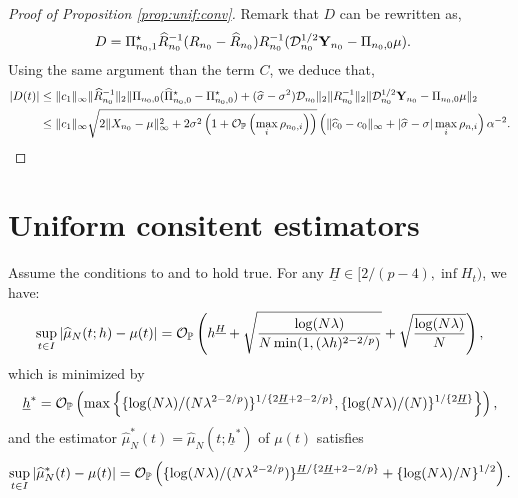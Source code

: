 \documentclass{article}
\begin{document}
\begin{proof}[Proof of Proposition \ref{prop:unif:conv}]
\medskip

Remark that $D$ can be rewritten as,
\begin{align*}
D &= {\Pi}_{n_0,1}^\star \widehat{R}_{n_0}^{-1} ({R}_{n_0}- \widehat{R}_{n_0}) {R}_{n_0}^{-1} (\mathcal{D}^{1/2}_{n_0}\mathbf{Y}_{n_0}-\Pi_{n_0,0}\mu).
\end{align*}
Using the same argument than the term $C$, we deduce that,
\begin{align*}
|D(t)| &\leq \|c_1\|_\infty \|\widehat{R}_{n_0}^{-1}\|_2 \| \Pi_{n_0,0}(\widehat{\Pi}_{n_0,0}^\star - {\Pi}_{n_0,0}^\star) + (\widehat{\sigma}-\sigma^2)\mathcal{D}_{n_0}\|_2 \| {R}_{n_0}^{-1}\|_2 \|\mathcal{D}^{1/2}_{n_0}\mathbf{Y}_{n_0}-\Pi_{n_0,0}\mu\|_2\\
&\leq \|c_1\|_\infty \sqrt{2\|X_{n_0}-\mu\|_\infty^2 +2\sigma^2 \left(1 + \mathcal{O}_{\mathbb{P}}\left(\max_{i}\rho_{n_0,i}\right)\right)} \left(\|\widehat{c}_0-c_0\|_\infty + |\widehat{\sigma}-\sigma| \max_{i}\rho_{n,i}  \right)\alpha^{-2}.
\end{align*}
\end{proof}



\section{Uniform consitent estimators}


\begin{theorem}\label{thm:mean_unif_cv}
	Assume the conditions  to  and  to  hold true. For any $\underline{H}\in[2/(p-4),\inf H_t)$, we have:
	\begin{equation}
		\sup_{t\in I}|\widehat{\mu}_N(t;h) - \mu(t)| = 
		\mathcal{O}_{\mathbb{P}}\left(h^{\underline{H}} + \sqrt{\frac{\log(N\lambda)}{N\min(1,(\lambda h)^{2-2/p})}} + \sqrt{\frac{\log(N \lambda)}{N}}\right),
	\end{equation}
	which is minimized by 
	\begin{equation}
		\underline{h}^* = \mathcal{O}_{\mathbb{P}}\left( \max\left\{\{\log(N \lambda) / (N\lambda^{2-2/p})\}^{1 / \{2 \underline{H}+2-2/p\}}, \{{\log(N \lambda)} / (N)\}^{1 / \{2\underline{H}\}}\right\}\right),
	\end{equation}
	and the estimator $\widehat{\mu}_N^*(t) = \widehat{\mu}_N(t; \underline{h}^*) $ of $\mu(t)$ satisfies
	\begin{equation}
		\sup_{t\in I}|\widehat{\mu}_N^*(t) - \mu(t)| = \mathcal{O}_{\mathbb{P}}\left( \{{\log(N \lambda)} / (N \lambda^{2-2/p})\}^{\underline{H} / \{2\underline{H} + 2 -2/p\}} + \{{\log(N \lambda)} / N\}^{1 / 2}\right).
	\end{equation}
\end{theorem}
\end{document}
